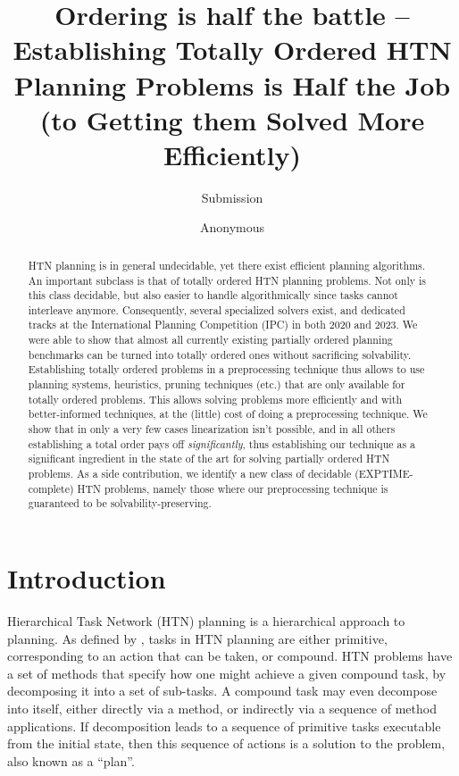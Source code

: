\documentclass[letterpaper]{article} %
\author {
    Submission
}
\author {
    Anonymous

}
\title{Ordering is half the battle -- Establishing Totally Ordered HTN
	Planning Problems is Half the Job (to Getting them Solved More Efficiently)}
\begin{document}
\maketitle

\begin{abstract} 
HTN planning is in general undecidable, yet there exist efficient
planning algorithms. An important subclass is that of totally ordered
HTN planning problems. Not only is this class decidable, but also easier
to handle algorithmically since tasks cannot interleave anymore.
Consequently, several specialized solvers exist, and dedicated tracks at
the International Planning Competition (IPC) in both 2020 and 2023. We
were able to show that almost all currently existing partially ordered
planning benchmarks can be turned into totally ordered ones without
sacrificing solvability. Establishing totally ordered problems in a
preprocessing technique thus allows to use planning systems, heuristics,
pruning techniques (etc.) that are only available for totally ordered
problems. This allows solving problems more efficiently and with
better-informed techniques, at the (little) cost of doing a
preprocessing technique. We show that in only a very few cases
linearization isn't possible, and in all others establishing a total
order pays off \emph{significantly}, thus establishing our technique as
a significant ingredient in the state of the art for solving partially
ordered HTN problems. As a side contribution, we identify a new class of
decidable (EXPTIME-complete) HTN problems, namely those where our
preprocessing technique is guaranteed to be solvability-preserving.
\end{abstract}
 
 

 
 
 
\section{Introduction}
Hierarchical Task Network (HTN) planning is a hierarchical approach to planning. As defined by \cite{HTNSurvey},  %
tasks in HTN planning are either primitive, corresponding to an action that can be taken, or compound. HTN problems have a set of methods that specify how one might achieve a given compound task, by decomposing it into a set of sub-tasks. A compound task may even decompose into itself, either directly via a method, or indirectly via a sequence of method applications. If decomposition leads to a sequence of primitive tasks executable from the initial state, then this sequence of actions is a solution to the problem, also known as a \enquote{plan}. 
\end{document}
